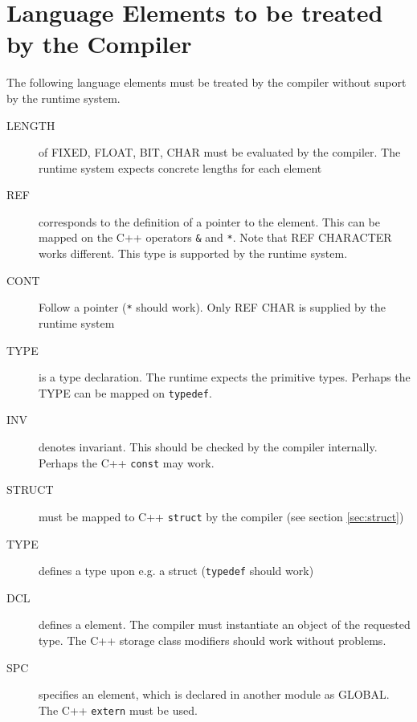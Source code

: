 \chapter{Language Elements to be treated by the Compiler}
The following language elements must be treated by the compiler 
without suport by the runtime system.

\begin{description}
\item[LENGTH] of FIXED, FLOAT, BIT, CHAR must be evaluated by the 
    compiler. The runtime system expects concrete lengths for each element
\item[REF] corresponds to the definition of a pointer to the 
    element. This can be mapped on the C++ operators \verb|&| and \verb|*|.
    Note that REF CHARACTER works different. This type is supported by the
    runtime system.
\item[CONT] Follow a pointer (\verb|*| should work). 
		Only REF CHAR is supplied by the runtime system
\item[TYPE] is a type declaration. The runtime expects the primitive types.
   Perhaps the TYPE can be mapped on \verb|typedef|.
\item[INV] denotes invariant. This should be checked by the compiler internally.
    Perhaps the C++ \verb|const| may work. 
\item[STRUCT] must be mapped to C++ \verb|struct| by the compiler 
(see section \ref{sec:struct})
\item[TYPE] defines a type  upon e.g. a struct (\verb|typedef| should work)
\item[DCL] defines a element. The compiler must instantiate an object
    of the requested type. The C++ storage class modifiers should work
    without problems.
\item[SPC] specifies an element, which is declared in another module as
  GLOBAL. The C++ \verb|extern| must be used.
\end{description}

 

